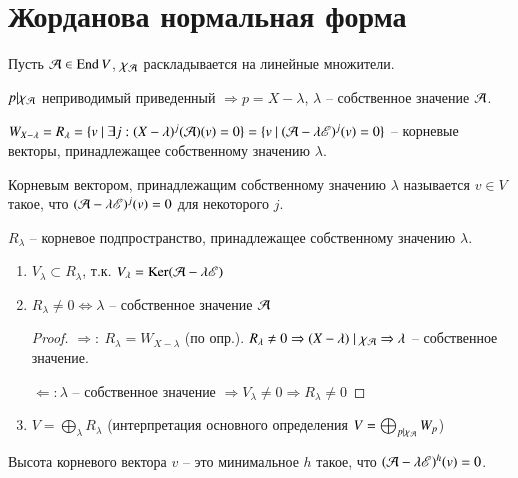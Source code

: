 \documentclass[main]{subfiles}
\begin{document}
\chapter{Жорданова нормальная форма}

Пусть $\mathcal{A} \in \operatorname{End} V$, $\chi_{\mathcal{A}}$ раскладывается на линейные множители.

$p| \chi_{\mathcal{A}}$ неприводимый приведенный $\Rightarrow p = X - \lambda$, $\lambda$ -- собственное значение $\mathcal{A}$.

$W_{X-\lambda} = R_{\lambda} = \{v \ | \ \exists j:(X-\lambda)^j (\mca) (v) = 0\} =
  \{v \ | \ (\mca - \lambda \mse )^j (v) = 0\}$ -- корневые векторы, принадлежащее собственному значению $\lambda$.

\begin{definition} 
  Корневым вектором, принадлежащим собственному значению $\lambda$ называется $v \in V$ такое, что $(\mathcal{A} - \lambda \mathscr{E})^j (v) = 0$ для некоторого $j$.

  $R_{\lambda}$ -- корневое подпространство, принадлежащее собственному значению $\lambda$.
\end{definition}

\begin{propertylist}
  \begin{enumerate}
    \item $V_{\lambda} \subset R_{\lambda}$, т.к. $V_{\lambda} = \operatorname{Ker}(\mathcal{A} - \lambda \mathscr{E})$
    \item $R_{\lambda} \neq 0 \Leftrightarrow \lambda$ -- собственное значение $\mathcal{A}$
          \begin{proof}
            $\Rightarrow: \ R_{\lambda} = W_{X-\lambda}$ (по опр.). $R_{\lambda} \neq 0 \Rightarrow
              (X - \lambda) \mid \chi_{\mathcal{A}} \Rightarrow \lambda$ -- собственное значение.

            $\Leftarrow: \lambda$ -- собственное значение $\Rightarrow V_{\lambda} \neq 0 \Rightarrow R_{\lambda} \neq 0$
          \end{proof}
    \item $V = \bigoplus_{\lambda} R_{\lambda}$ (интерпретация основного определения $V = \bigoplus_{p | \chi_{\mathcal{A}}} W_p$)
  \end{enumerate}
\end{propertylist}

\begin{definition} 
  Высота корневого вектора $v$ -- это минимальное $h$ такое, что $(\mathcal{A} - \lambda \mathscr{E})^h (v) = 0$.
\end{definition}
\end{document}
